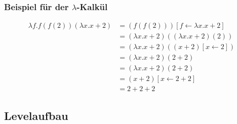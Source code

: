 \documentclass{scrartcl}
\begin{document}
\begin{minipage}{1\textwidth}
\subsubsection{Beispiel für der \texorpdfstring{$\lambda$}{Lambda}-Kalkül}
\[
	\begin{aligned}
		\lambda f.f(f(2))(\lambda x.x+2)&= (f(f(2)))[f \leftarrow \lambda x.x+2] \\
		&= (\lambda x.x+2)((\lambda x.x+2)(2)) \\
		&= (\lambda x.x+2)((x+2)[x \leftarrow 2]) \\
		&= (\lambda x.x+2)(2 + 2) \\
		&= (\lambda x.x+2)(2 + 2) \\
		&= (x+2)[x \leftarrow 2 + 2] \\
		&= 2 + 2 + 2
	\end{aligned}
\]
\end{minipage}


\subsection{Levelaufbau}  \label{subsection:Levelaufbau}
\end{document}
